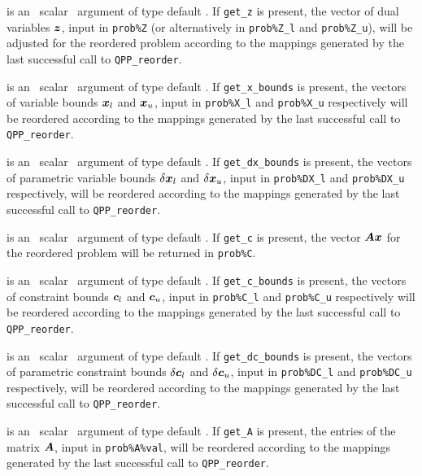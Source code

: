 \documentclass{galahad}
\newcommand{\packagename}{QPP}
\begin{document}
\begin{description}
is an \optional\ scalar \intentin\ argument of type default \logical. 
If {\tt get\_z} is present, the vector of dual variables ${\bm{z}}$, input in 
{\tt prob\%Z} (or alternatively in {\tt prob\%Z\_l} and {\tt prob\%Z\_u}),
will be adjusted for the reordered problem according 
to the mappings generated by the last successful 
call to {\tt \packagename\_reorder}. 
 
is an \optional\ scalar \intentin\ argument of type default \logical. 
If {\tt get\_x\_bounds} is present, 
the vectors of variable bounds ${\bm{x}}_l$ and 
${\bm{x}}_u$, input in {\tt prob\%X\_l} and {\tt prob\%X\_u} respectively
will be reordered according to the 
mappings generated by the last successful call to {\tt \packagename\_reorder}. 
 
is an \optional\ scalar \intentin\ argument of type default \logical. 
If {\tt get\_dx\_bounds} is present, 
the vectors of parametric variable bounds $\delta {\bm{x}}_l$ and 
$\delta {\bm{x}}_u$, input in {\tt prob\%DX\_l} and {\tt prob\%DX\_u} respectively,
will be reordered according to the 
mappings generated by the last successful call to {\tt \packagename\_reorder}. 
 
is an \optional\ scalar \intentin\ argument of type default \logical. 
If {\tt get\_c} is present, the vector ${\bm{A}} {\bm{x}}$ for the reordered problem 
will be returned in {\tt prob\%C}. 
 
is an \optional\ scalar \intentin\ argument of type default \logical. 
If {\tt get\_c\_bounds} is present, 
the vectors of constraint bounds ${\bm{c}}_l$ and 
${\bm{c}}_u$, input in {\tt prob\%C\_l} and {\tt prob\%C\_u} respectively
will be reordered according to the 
mappings generated by the last successful call to {\tt \packagename\_reorder}. 
 
is an \optional\ scalar \intentin\ argument of type default \logical. 
If {\tt get\_dc\_bounds} is present, 
the vectors of parametric constraint bounds $\delta {\bm{c}}_l$ and 
$\delta {\bm{c}}_u$, input in {\tt prob\%DC\_l} and {\tt prob\%DC\_u} respectively,
will be reordered according to the 
mappings generated by the last successful call to {\tt \packagename\_reorder}. 
 
is an \optional\ scalar \intentin\ argument of type default \logical. 
If {\tt get\_A} is present, the entries of the 
matrix ${\bm{A}}$, input in {\tt prob\%A\%val}, will be reordered according to the 
mappings generated by the last successful call to {\tt \packagename\_reorder}. 
 

\end{description}
\end{document}
